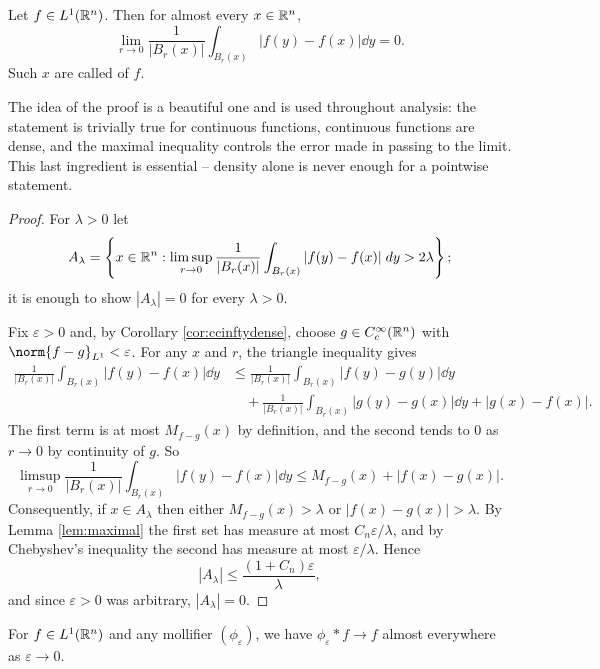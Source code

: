 \documentclass[a4paper]{scrartcl}
\begin{document}
\begin{theorem}\label{thm:lebdiff}
	Let $f \in L^1(\mathbb{R}^n)$. Then for almost every $x \in \mathbb{R}^n$,
	$$\lim_{r \to 0} \frac{1}{|B_r(x)|} \int_{B_r(x)} |f(y) - f(x)| \dd y = 0.$$
	Such $x$ are called  of $f$.
\end{theorem}

The idea of the proof is a beautiful one and is used throughout analysis: the statement is trivially true for continuous functions, continuous functions are dense, and the maximal inequality controls the error made in passing to the limit. This last ingredient is essential -- density alone is never enough for a pointwise statement.

\begin{proof}
	For $\lambda > 0$ let
	$$A_\lambda = \left\{ x \in \mathbb{R}^n : \limsup_{r \to 0}\frac{1}{|B_r(x)|}\int_{B_r(x)}|f(y)-f(x)| \; d y > 2\lambda \right\};$$
	it is enough to show $|A_\lambda| = 0$ for every $\lambda > 0$.

	Fix $\varepsilon > 0$ and, by Corollary \ref{cor:ccinftydense}, choose $g \in C_c^\infty(\mathbb{R}^n)$ with $\norm{f - g}_{L^1} < \varepsilon$. For any $x$ and $r$, the triangle inequality gives
	\begin{align*}
		\frac{1}{|B_r(x)|}\int_{B_r(x)}|f(y) - f(x)| \dd y &\le \frac{1}{|B_r(x)|}\int_{B_r(x)}|f(y) - g(y)|\dd y \\
		&\quad + \frac{1}{|B_r(x)|}\int_{B_r(x)}|g(y) - g(x)| \dd y + |g(x) - f(x)|.
	\end{align*}
	The first term is at most $M_{f-g}(x)$ by definition, and the second tends to $0$ as $r \to 0$ by continuity of $g$. So
	$$\limsup_{r \to 0}\frac{1}{|B_r(x)|}\int_{B_r(x)}|f(y)-f(x)|\dd y \le M_{f-g}(x) + |f(x) - g(x)|.$$
	Consequently, if $x \in A_\lambda$ then either $M_{f-g}(x) > \lambda$ or $|f(x)-g(x)| > \lambda$. By Lemma \ref{lem:maximal} the first set has measure at most $C_n \varepsilon/\lambda$, and by Chebyshev's inequality the second has measure at most $\varepsilon/\lambda$. Hence
	$$|A_\lambda| \le \frac{(1 + C_n)\varepsilon}{\lambda},$$
	and since $\varepsilon > 0$ was arbitrary, $|A_\lambda| = 0$.
\end{proof}

\begin{corollary}
	For $f \in L^1(\mathbb{R}^n)$ and any mollifier $(\phi_\varepsilon)$, we have $\phi_\varepsilon * f \to f$ almost everywhere as $\varepsilon \to 0$.
\end{corollary}
\end{document}
